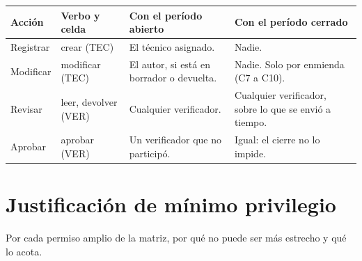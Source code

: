 \documentclass[11pt,letterpaper]{article}
\newcommand{\cab}[1]{\textbf{\rmfamily #1}}
\begin{document}
\begin{center}
\small
\renewcommand{\arraystretch}{1.25}
\begin{tabularx}{\textwidth}{@{}L{2.7cm} L{2.6cm} Y Y@{}}
\toprule
\cab{Acción} & \cab{Verbo y celda} & \cab{Con el período abierto} & \cab{Con el período cerrado} \\
\midrule
Registrar & crear (TEC) & El técnico asignado. & Nadie. \\
Modificar & modificar (TEC) & El autor, si está en borrador o devuelta. & Nadie. Solo por enmienda (C7 a C10). \\
Revisar & leer, devolver (VER) & Cualquier verificador. & Cualquier verificador, sobre lo que se envió a tiempo. \\
Aprobar & aprobar (VER) & Un verificador que no participó. & Igual: el cierre no lo impide. \\
\bottomrule
\end{tabularx}
\end{center}

\section{Justificación de mínimo privilegio}

Por cada permiso amplio de la matriz, por qué no puede ser más estrecho y qué lo acota.
\end{document}

